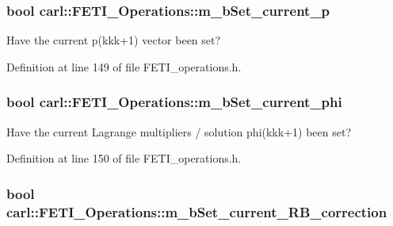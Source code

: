 \subsubsection[{m\+\_\+b\+Set\+\_\+current\+\_\+p}]{\setlength{\rightskip}{0pt plus 5cm}bool carl\+::\+F\+E\+T\+I\+\_\+\+Operations\+::m\+\_\+b\+Set\+\_\+current\+\_\+p\hspace{0.3cm}{\ttfamily [protected]}}\label{classcarl_1_1_f_e_t_i___operations_ae72a5d292fd78d8ca56039d822d5078c}


Have the current {\ttfamily p(kkk+1)} vector been set? 



Definition at line 149 of file F\+E\+T\+I\+\_\+operations.\+h.

\hypertarget{classcarl_1_1_f_e_t_i___operations_af9131d1125ae99d73932d11ee5c4c7b7}{}
\subsubsection[{m\+\_\+b\+Set\+\_\+current\+\_\+phi}]{\setlength{\rightskip}{0pt plus 5cm}bool carl\+::\+F\+E\+T\+I\+\_\+\+Operations\+::m\+\_\+b\+Set\+\_\+current\+\_\+phi\hspace{0.3cm}{\ttfamily [protected]}}\label{classcarl_1_1_f_e_t_i___operations_af9131d1125ae99d73932d11ee5c4c7b7}


Have the current Lagrange multipliers / solution {\ttfamily phi(kkk+1)} been set? 



Definition at line 150 of file F\+E\+T\+I\+\_\+operations.\+h.

\hypertarget{classcarl_1_1_f_e_t_i___operations_a4ba412e4dc2d64b62ebcf81773ed5ce8}{}
\subsubsection[{m\+\_\+b\+Set\+\_\+current\+\_\+\+R\+B\+\_\+correction}]{\setlength{\rightskip}{0pt plus 5cm}bool carl\+::\+F\+E\+T\+I\+\_\+\+Operations\+::m\+\_\+b\+Set\+\_\+current\+\_\+\+R\+B\+\_\+correction\hspace{0.3cm}{\ttfamily [protected]}}\label{classcarl_1_1_f_e_t_i___operations_a4ba412e4dc2d64b62ebcf81773ed5ce8}


